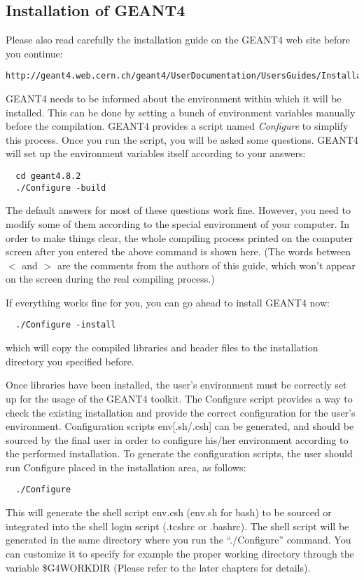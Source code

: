 \subsection{Installation of GEANT4}
Please also read carefully the installation guide on the GEANT4 web site
before you continue:
\begin{lstlisting}
http://geant4.web.cern.ch/geant4/UserDocumentation/UsersGuides/InstallationGuide/html/index.html
\end{lstlisting}
GEANT4 needs to be informed about the environment within which it will be
installed. This can be done by setting a bunch of environment
variables manually before the compilation. GEANT4 provides a script
named \emph{Configure} to simplify this process. Once you run the
script, you will be asked some questions. GEANT4 will set up the
environment variables itself according to your answers:
\begin{lstlisting}
  cd geant4.8.2 
  ./Configure -build
\end{lstlisting}

The default answers for most of these questions work fine. However,
you need to modify some of them according to the special environment
of your computer. In order to make things clear, the whole compiling
process printed on the computer screen after you entered the above
command is shown here.
(The words between $<$ and $>$ are the
comments from the authors of this guide, which won't appear on the
screen during the real compiling process.)



If everything works fine for you, you can go ahead to install GEANT4
now:
\begin{lstlisting}
  ./Configure -install
\end{lstlisting}
which will copy the compiled libraries and header files to the
installation directory you specified before.

Once libraries have been installed, the user's environment must be
correctly set up for the usage of the GEANT4 toolkit. The Configure
script provides a way to check the existing installation and provide
the correct configuration for the user's environment. Configuration
scripts env[.sh/.csh] can be generated, and should be sourced by the
final user in order to configure his/her environment according to the
performed installation. To generate the configuration scripts, the
user should run Configure placed in the installation area, as follows:
\begin{lstlisting}
  ./Configure
\end{lstlisting}
This will generate the shell script env.csh (env.sh for bash) to be
sourced or integrated into the shell login script (.tcshrc or
.bashrc). The shell script will be generated in the same directory
where you run the ``./Configure'' command. You can customize it to
specify for example the proper working directory through the variable
\$G4WORKDIR (Please refer to the later chapters for details).

